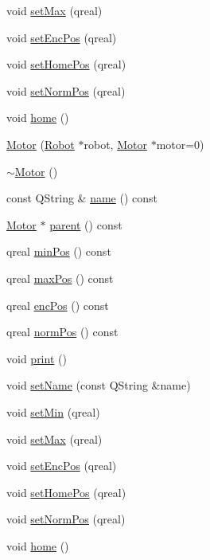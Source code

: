 \begin{DoxyCompactItemize}
void \hyperlink{class_robot_model_1_1_motor_ad52f8d0e1aa0b5f60b388188147a1ded}{setMax} (qreal)
\item 
void \hyperlink{class_robot_model_1_1_motor_a80d5a42cb4cc119afe0bdd4ed90a4152}{setEncPos} (qreal)
\item 
void \hyperlink{class_robot_model_1_1_motor_a2467c521c141e2cc9cf21d85d56dd20b}{setHomePos} (qreal)
\item 
void \hyperlink{class_robot_model_1_1_motor_a2c26ea7475deaef6e1546edbadf88729}{setNormPos} (qreal)
\item 
void \hyperlink{class_robot_model_1_1_motor_ae8e0845a9284fbf8013137bf6b1f9293}{home} ()
\item 
\hyperlink{class_robot_model_1_1_motor_a08854611f8e0f2d4fca849defb99ffe3}{Motor} (\hyperlink{class_robot_model_1_1_robot}{Robot} $\ast$robot, \hyperlink{class_robot_model_1_1_motor}{Motor} $\ast$motor=0)
\item 
\hyperlink{class_robot_model_1_1_motor_aec13680224c7d1f28ca5f1fc58044577}{$\sim$Motor} ()
\item 
const QString \& \hyperlink{class_robot_model_1_1_motor_a35eeb7f97a9339ee23c0689af2463c17}{name} () const 
\item 
\hyperlink{class_robot_model_1_1_motor}{Motor} $\ast$ \hyperlink{class_robot_model_1_1_motor_a31de5801eb1a089723a7f6980baff4a2}{parent} () const 
\item 
qreal \hyperlink{class_robot_model_1_1_motor_af2cc406d7443e2cf350408d12b8e544b}{minPos} () const 
\item 
qreal \hyperlink{class_robot_model_1_1_motor_abd6baf3a9ae74dcf970663e5ee303131}{maxPos} () const 
\item 
qreal \hyperlink{class_robot_model_1_1_motor_a8f95b65d6bf72038a4aca3a394609354}{encPos} () const 
\item 
qreal \hyperlink{class_robot_model_1_1_motor_a99de4f0e475ec8bea35fa3977fa8731f}{normPos} () const 
\item 
void \hyperlink{class_robot_model_1_1_motor_a13211064ca499df6c213375c8e586af1}{print} ()
\item 
void \hyperlink{class_robot_model_1_1_motor_a9efaa43179205b53df370f7811023eb6}{setName} (const QString \&name)
\item 
void \hyperlink{class_robot_model_1_1_motor_a7b4372f0624f51c3c1acf7714aaa0c61}{setMin} (qreal)
\item 
void \hyperlink{class_robot_model_1_1_motor_a431bd76eab217aa1ab36b6c35cd52745}{setMax} (qreal)
\item 
void \hyperlink{class_robot_model_1_1_motor_a6f0bb363e496cbc575fe1f0d236193f6}{setEncPos} (qreal)
\item 
void \hyperlink{class_robot_model_1_1_motor_a6f650f0a9a2e2277023deecec489515f}{setHomePos} (qreal)
\item 
void \hyperlink{class_robot_model_1_1_motor_a1900f848b543b1ec78701b92d9a1cfcb}{setNormPos} (qreal)
\item 
void \hyperlink{class_robot_model_1_1_motor_a65b92706160d761b0abb2dfc462d832e}{home} ()
\end{DoxyCompactItemize}


